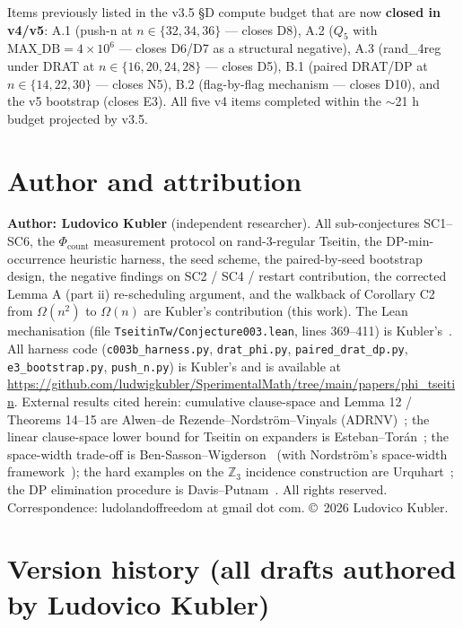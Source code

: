 \documentclass[11pt,a4paper]{article}
\theoremstyle{remark}
\begin{document}
{Items previously listed in the v3.5 \S D compute budget that are now
\textbf{closed in v4/v5}: A.1 (push-n at $n \in \{32, 34, 36\}$ ---
closes D8), A.2 ($Q_5$ with $\mathrm{MAX\_DB} = 4 \times 10^6$ --- closes
D6/D7 as a structural negative), A.3 (rand\_4reg under DRAT at $n \in
\{16, 20, 24, 28\}$ --- closes D5), B.1 (paired DRAT/DP at $n \in \{14,
22, 30\}$ --- closes N5), B.2 (flag-by-flag mechanism --- closes D10),
and the v5 bootstrap (closes E3). All five v4 items completed within the
$\sim$21 h budget projected by v3.5.

\clearpage
\section*{Author and attribution}

\textbf{Author: Ludovico Kubler} (independent researcher). All
sub-conjectures SC1--SC6, the $\Phi_{\mathrm{count}}$ measurement
protocol on rand-3-regular Tseitin, the DP-min-occurrence heuristic
harness, the seed scheme, the paired-by-seed bootstrap design, the
negative findings on SC2 / SC4 / restart contribution, the corrected
Lemma A (part ii) re-scheduling argument, and the walkback of
Corollary C2 from $\Omega(n^2)$ to $\Omega(n)$ are Kubler's contribution
(this work). The Lean mechanisation (file
\texttt{TseitinTw/Conjecture003.lean}, lines 369--411) is
Kubler's~\cite{KublerSperimentalMath}.
All harness code (\texttt{c003b\_harness.py}, \texttt{drat\_phi.py},
\texttt{paired\_drat\_dp.py}, \texttt{e3\_bootstrap.py},
\texttt{push\_n.py}) is Kubler's and is available at
\url{https://github.com/ludwigkubler/SperimentalMath/tree/main/papers/phi_tseitin}.
External results cited herein: cumulative clause-space and
Lemma 12 / Theorems 14--15 are Alwen--de Rezende--Nordstr\"om--Vinyals
(ADRNV)~\cite{ADRNV2017}; the linear clause-space lower bound for
Tseitin on expanders is Esteban--Tor\'an~\cite{EstebanToran1999}; the
space-width trade-off is Ben-Sasson--Wigderson~\cite{BSW2001} (with
Nordstr\"om's space-width framework~\cite{Nordstrom2013}); the hard
examples on the $\mathbb{Z}_3$ incidence construction are
Urquhart~\cite{Urquhart1987}; the DP elimination procedure is
Davis--Putnam~\cite{DavisPutnam1960}. All rights reserved.
Correspondence: ludolandoffreedom at gmail dot com.
\copyright\ 2026 Ludovico Kubler.

\section*{Version history (all drafts authored by Ludovico Kubler)}

}
\end{document}
